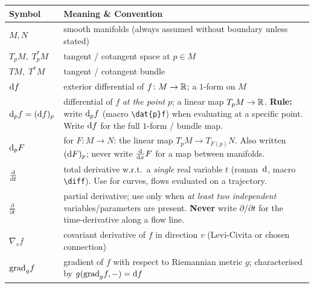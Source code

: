 \begin{longtable}{@{} p{4cm} p{10cm} @{}}
	\toprule
	\textbf{Symbol} & \textbf{Meaning \& Convention} \\
	\midrule
	\endhead
	
	$M, N$ & smooth manifolds (always assumed without boundary unless stated) \\[4pt]
	
	$T_p M,\; T^*_p M$ & tangent / cotangent space at $p \in M$ \\[4pt]
	
	$TM,\; T^*M$ & tangent / cotangent bundle \\[4pt]
	
	$\mathop{}\!\mathrm{d} f$ & exterior differential of $f\colon M\to\mathbb{R}$; a $1$-form on $M$ \\[4pt]
	
	$\mathop{}\!\mathrm{d}_{p} f = (\mathop{}\!\mathrm{d} f)_p$ & differential of $f$ \emph{at the point} $p$;
	a linear map $T_p M \to \mathbb{R}$.
	\newline
	\textbf{Rule:} write $\mathop{}\!\mathrm{d}_{p}f$ (macro \texttt{\textbackslash dat\{p\}f})
	when evaluating at a specific point.
	Write $\mathop{}\!\mathrm{d} f$ for the full $1$-form / bundle map.\\[4pt]
	
	$\mathop{}\!\mathrm{d}_{p} F$ & for $F\colon M\to N$: the linear map $T_p M\to T_{F(p)}N$.
	Also written $({\mathop{}\!\mathrm{d} F})_p$; never write $\frac{\mathop{}\!\mathrm{d}}{\mathop{}\!\mathrm{d} x}F$
	for a map between manifolds. \\[4pt]
	
	$\frac{\mathop{}\!\mathrm{d}}{\mathop{}\!\mathrm{d} t}$
	& total derivative w.r.t.\ a \emph{single} real variable $t$
	(roman~$\mathop{}\!\mathrm{d}$, macro \texttt{\textbackslash diff}).
	Use for curves, flows evaluated on a trajectory. \\[4pt]
	
	$\frac{\partial}{\partial t}$
	& partial derivative; use only when \emph{at least two independent}
	variables/parameters are present.
	\textbf{Never} write $\partial/\partial t$ for the time-derivative along
	a flow line. \\[4pt]
	
	$\nabla_v f$ & covariant derivative of $f$ in direction $v$
	(Levi-Civita or chosen connection) \\[4pt]
	
	$\mathrm{grad}_g f$ & gradient of $f$ with respect to Riemannian metric $g$;
	characterised by $g(\mathrm{grad}_g f, -) = \mathop{}\!\mathrm{d} f$ \\[4pt]
	
	\bottomrule
\end{longtable}

